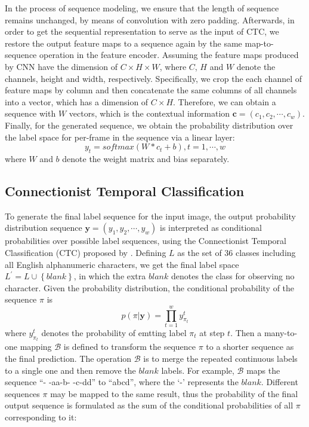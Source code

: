 \documentclass[letterpaper]{article} %
\begin{document}
In the process of sequence modeling, we ensure that the length of sequence remains unchanged, by means of convolution with zero padding. Afterwards, in order to get the sequential representation to serve as the input of CTC, we restore the output feature maps to a sequence again by the same map-to-sequence operation in the feature encoder. Assuming the feature maps produced by CNN have the dimension of $C \times H \times W$, where $C$, $H$ and $W$ denote the channels, height and width, respectively. Specifically, we crop the each channel of feature maps by column and then concatenate the same columns of all channels into a vector, which has a dimension of $C \times H$. Therefore, we can obtain a sequence with $W$ vectors, which is the contextual information $\textbf{c} = (c_{1}, c_{2}, \cdots, c_{w})$. Finally, for the generated sequence, we obtain the probability distribution over the label space for per-frame in the sequence via a linear layer:
\begin{equation}
y_{t}=softmax(W*c_{t}+b), t=1, \cdots, w
\end{equation}
where $W$ and $b$ denote the weight matrix and bias separately.

\subsection{Connectionist Temporal Classification}
To generate the final label sequence for the input image, the output probability distribution sequence $\textbf{y} = (y_{1}, y_{2}, \cdots, y_{w})$ is interpreted as conditional probabilities over possible label sequences, using the Connectionist Temporal Classification (CTC) proposed by \cite{graves2006connectionist}. Defining $L$ as the set of 36 classes including all English alphanumeric characters, we get the final label space $L^{'}=L \cup { \left\{ blank \right\} }$, in which the extra $blank$ denotes the class for observing no character. Given the probability distribution, the conditional probability of the sequence $\pi$ is
\begin{equation}
p( \pi | \textbf{y}) = \prod^{w}_{t=1} y^{t}_{\pi_{t}}
\end{equation}
where $y^{t}_{\pi_{t}}$ denotes the probability of emtting label $\pi_{t}$ at step $t$. Then a many-to-one mapping $\mathcal{B}$ is defined to transform the sequence $\pi$ to a shorter sequence as the final prediction. The operation $\mathcal{B}$ is to merge the repeated continuous labels to a single one and then remove the $blank$ labels. For example, $\mathcal{B}$ maps the sequence ``- -aa-b- -c-dd'' to ``abcd'', where the `-' represents the $blank$. Different sequences $\pi$ may be mapped to the same result, thus the probability of the final output sequence is formulated as the sum of the conditional probabilities of all $\pi$ corresponding to it:
\end{document}
